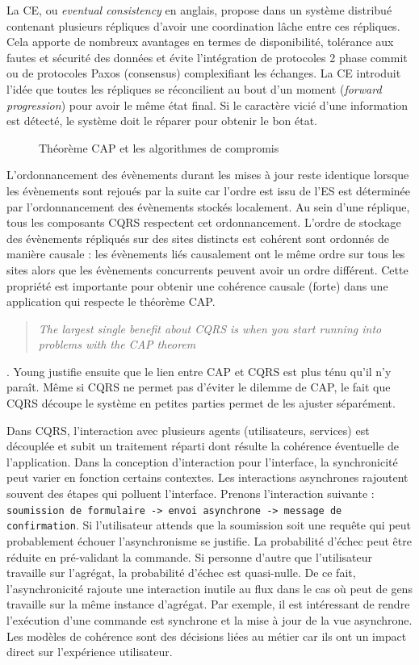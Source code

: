 La \gls{CE}, ou \textit{eventual consistency} en anglais, propose dans un système 
distribué contenant plusieurs répliques d'avoir une coordination lâche entre ces 
répliques. Cela apporte de nombreux avantages en termes de disponibilité, 
tolérance aux fautes et sécurité des données et évite l'intégration de protocoles 2 
phase commit ou de protocoles Paxos (consensus) complexifiant les échanges. 
La \gls{CE} introduit l'idée que toutes les répliques se réconcilient au bout d'un 
moment (\textit{forward progression}) pour avoir le même état final. Si le caractère 
vicié d'une information est détecté, le système doit le \og réparer\fg{} pour obtenir 
le bon état. 
\begin{figure} [ht]
	\centering
	\caption{Théorème CAP et les algorithmes de compromis}
\end{figure}
L'ordonnancement des évènements durant les mises à jour reste identique lorsque
les évènements sont rejoués par la suite car l'ordre est issu de l'\gls{ES} est 
déterminée par l'ordonnancement des évènements stockés 
localement. Au sein d'une réplique, tous les composants \gls{CQRS} respectent 
cet ordonnancement. L’ordre de stockage des évènements répliqués sur des sites 
distincts est cohérent sont ordonnés de manière causale \cite{Lamport1978} : les 
évènements liés causalement ont le même ordre sur tous les sites alors que les 
évènements concurrents peuvent avoir un ordre différent. Cette propriété est 
importante pour obtenir une cohérence causale (forte) dans une application qui 
respecte le théorème \gls{CAP}.  \blockquote[]{	\textit{The largest single 
benefit about 
CQRS is when 
		you start running into 
		problems 
		with the CAP theorem}}{
	\cite{Young2010}
}.
Young justifie ensuite que le lien entre \gls{CAP} et \gls{CQRS} est plus ténu qu'il 
n'y paraît. Même si \gls{CQRS} ne permet pas d'éviter le dilemme de \gls{CAP}, le 
fait que \gls{CQRS} découpe le système en petites parties permet de les ajuster 
séparément.

Dans \gls{CQRS}, l'interaction avec plusieurs agents (utilisateurs, services) est 
découplée et subit un traitement réparti 
dont résulte la cohérence éventuelle de l'application. 
Dans la conception d'interaction pour l'interface, la synchronicité peut varier en 
fonction certains contextes. 
Les interactions asynchrones rajoutent souvent des étapes qui polluent l'interface.  
Prenons l'interaction suivante : \texttt{soumission de formulaire -> envoi 
asynchrone -> 
message de confirmation}. Si l'utilisateur attends que la soumission soit une 
requête qui peut probablement échouer l'asynchronisme se justifie. La probabilité 
d'échec peut être réduite en pré-validant la commande. Si personne d'autre que 
l'utilisateur travaille sur l'agrégat, la probabilité d'échec est quasi-nulle. De ce fait, 
l'asynchronicité rajoute une interaction inutile au flux dans le cas où peut de gens 
travaille sur la même instance d'agrégat.
Par exemple, il est intéressant de rendre l'exécution d'une 
commande est synchrone et la mise à jour de la vue asynchrone. Les modèles de 
cohérence sont des décisions liées au métier car ils ont un impact direct sur 
l'expérience utilisateur. 





